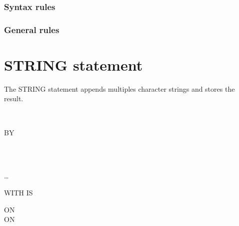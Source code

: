 
\begin{syntax}[\miscextcolour]
\end{syntax}

\subsubsection{Syntax rules}

\subsubsection{General rules}

\section{STRING statement}

The STRING statement appends multiples character strings and stores the result.

\begin{syntax}
  \begin{1=}
    \begin{1=}
      \identifier \\
      \literal
    \end{1=}

    \begin{0-1}
       BY
      \begin{1=}
         \\
        \identifier \\
        \literal
      \end{1=}
    \end{0-1}
  \end{1=} \ldots\ {}
   \identifier

  \begin{0-1}
    WITH  IS \identifier
  \end{0-1}

  \begin{0+}
    ON  \imperativestatement \\
     ON  \imperativestatement
  \end{0+}

  \begin{0-1}
  \end{0-1}
\end{syntax}

